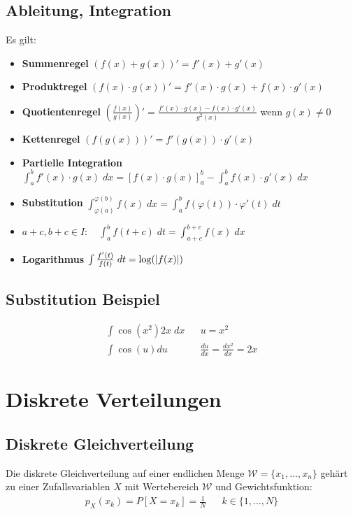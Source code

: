 \documentclass[8pt]{extarticle}
\newcommand{\W}{\mathcal{W}}
\begin{document}
\begin{multicols*}{3}
  \subsection*{Ableitung, Integration}
  Es gilt:
  \begin{itemize}
    \item \textbf{Summenregel} $ (f (x) + g (x))' = f' (x) + g' (x)$
    \item \textbf{Produktregel} $ (f (x) \cdot g (x))' = f' (x) \cdot g (x) + f (x) \cdot g' (x)$
    \item \textbf{Quotientenregel} $\left( \frac{f (x)}{g (x)} \right)' = \frac{f' (x) \cdot g (x) - f (x) \cdot g' (x)}{g^2 (x)}$ wenn $g (x) \neq 0$
    \item \textbf{Kettenregel} $ (f (g (x)))' = f' (g (x)) \cdot g' (x)$
    \item \textbf{Partielle Integration} $\int_a^b f' (x) \cdot g (x) \; dx = [f (x) \cdot g (x)]_a^b - \int_a^b f (x) \cdot g' (x) \; dx$
    \item \textbf{Substitution} $\int_{\varphi (a)}^{\varphi (b)} f (x) \; dx = \int_a^b f (\varphi (t)) \cdot \varphi' (t) \; dt$
    \item $a+c, b+c \in I: \quad \int_a^b f (t + c) \; dt = \int_{a+c}^{b+c} f (x) \; dx$
    \item \textbf{Logarithmus} $\int \frac{f' (t)}{f (t)} \; dt = \log (\abs{f (x)})$
  \end{itemize}
  \subsection*{Substitution Beispiel}
  \begin{align*}
    \int \cos (x^2) 2x \; dx &  & u = x^2                              \\
    \int \cos (u) du         &  & \frac{du}{dx} = \frac{dx^2}{dx} = 2x
  \end{align*}
  \hypertarget{sec:1}{\section{Diskrete Verteilungen}}
  \subsection*{Diskrete Gleichverteilung}
  Die diskrete Gleichverteilung auf einer endlichen Menge $\W = \{ x_1, \dots,
    x_n \}$ gehärt zu einer Zufallsvariablen $X$ mit Wertebereich $\W$ und
  Gewichtsfunktion:
  \begin{align*}
    p_X (x_k) = P[X = x_k] = \frac{1}{N} &  & k \in \{1, \dots, N\}
  \end{align*}

\end{multicols*}
\end{document}

